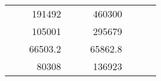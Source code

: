 \begin{table}[H]
\begin{tabular}{|ccrccrccc}
\multicolumn{1}{|c|}{\cellcolor[HTML]{FFFFC7}}                                & \multicolumn{1}{c|}{\cellcolor[HTML]{DDFDFF}}                      & \multicolumn{1}{r|}{\cellcolor[HTML]{DAE8FC}191492}    & \multicolumn{1}{c|}{\cellcolor[HTML]{FFFFC7}}                                & \multicolumn{1}{c|}{\cellcolor[HTML]{DDFDFF}}                       & \multicolumn{1}{r|}{\cellcolor[HTML]{DDFDFF}460300}    &                                                                              &                                                                    &                                                        \\ \cline{3-3} \cline{6-6}
\multicolumn{1}{|c|}{\cellcolor[HTML]{FFFFC7}}                                & \multicolumn{1}{c|}{\cellcolor[HTML]{DDFDFF}}                      & \multicolumn{1}{r|}{\cellcolor[HTML]{DDFDFF}105001}    & \multicolumn{1}{c|}{\cellcolor[HTML]{FFFFC7}}                                & \multicolumn{1}{c|}{\cellcolor[HTML]{DDFDFF}}                       & \multicolumn{1}{r|}{\cellcolor[HTML]{DAE8FC}295679}    &                                                                              &                                                                    &                                                        \\ \cline{3-3} \cline{6-6}
\multicolumn{1}{|c|}{\cellcolor[HTML]{FFFFC7}}                                & \multicolumn{1}{c|}{\cellcolor[HTML]{DDFDFF}}                      & \multicolumn{1}{r|}{\cellcolor[HTML]{DAE8FC}66503.2}   & \multicolumn{1}{c|}{\cellcolor[HTML]{FFFFC7}}                                & \multicolumn{1}{c|}{\cellcolor[HTML]{DDFDFF}}                       & \multicolumn{1}{r|}{\cellcolor[HTML]{DDFDFF}65862.8}   &                                                                              &                                                                    &                                                        \\ \cline{3-3} \cline{6-6}
\multicolumn{1}{|c|}{\cellcolor[HTML]{FFFFC7}}                                & \multicolumn{1}{c|}{\cellcolor[HTML]{DDFDFF}}                      & \multicolumn{1}{r|}{\cellcolor[HTML]{DDFDFF}80308}     & \multicolumn{1}{c|}{\cellcolor[HTML]{FFFFC7}}                                & \multicolumn{1}{c|}{\cellcolor[HTML]{DDFDFF}}                       & \multicolumn{1}{r|}{\cellcolor[HTML]{DAE8FC}136923}    &                                                                              &                                                                    &                                                        \\ \cline{3-3} \cline{6-6}

\end{tabular}
\end{table}
